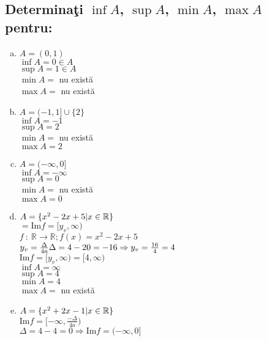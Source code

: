 \documentclass[a4paper, 12pt, notitlepage]{book}
\begin{document}
    \subsection{Determina\c{t}i $\inf A$, $\sup A$, $\min A$, $\max A$ pentru:}
    \begin{enumerate}[a.]
      \item $A = (0,1)$\\
            $\inf A = 0 \in A$\\
            $\sup A = 1 \in A$\\
            $\min A =$ nu exist\u{a}\\
            $\max A =$ nu exist\u{a}

      \item $A = (-1, 1] \cup \{2\} $\\
            $\inf A = -1$\\
            $\sup A = 2$\\
            $\min A =$ nu exist\u{a}\\
            $\max A = 2$

      \item $A = (-\infty, 0]$\\
            $\inf A = -\infty$\\
            $\sup A = 0$\\
            $\min A =$ nu exist\u{a}\\
            $\max A = 0$

      \item $A = \{x^{2} - 2x +5 \arrowvert x \in \mathbb{R}\}$\\
            $= \text{Im} f=[y_{v}, \infty)$\\
            $f\ :\ \mathbb{R} \to \mathbb{R}; f(x) = x^{2} - 2x +5$\\
            $y_{v} = \frac{\Delta}{4a}\\
            \Delta = 4-20 = -16 \Rightarrow y_{v} = \frac{16}{4} = 4$\\

            $\text{Im} f=[y_{v}, \infty) = [4, \infty)$\\

            $\inf A = \infty$\\
            $\sup A = 4$\\
            $\min A = 4$ \\
            $\max A = $ nu exist\u{a}

      \item $A = \{x^{2} + 2x - 1 \arrowvert x \in \mathbb{R}\}$\\
            $\text{Im} f=[-\infty, \frac{-\Delta}{4a})$\\
            $\Delta = 4-4 = 0 \Rightarrow \text{Im} f=(-\infty, 0]$


\end{enumerate}
\end{document}
